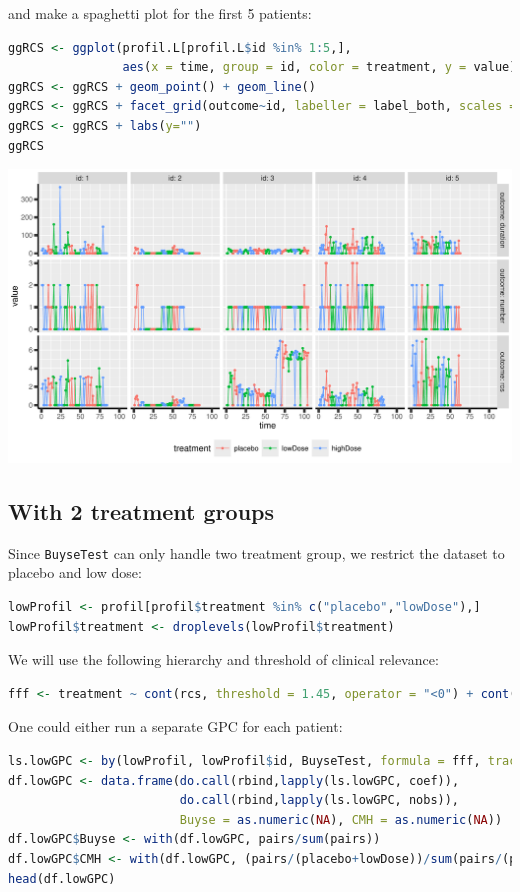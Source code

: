 \documentclass[12pt]{article}
\begin{document}
and make a spaghetti plot for the first 5 patients:
\begin{lstlisting}[language=r,numbers=none]
ggRCS <- ggplot(profil.L[profil.L$id %in% 1:5,],
                aes(x = time, group = id, color = treatment, y = value))
ggRCS <- ggRCS + geom_point() + geom_line() 
ggRCS <- ggRCS + facet_grid(outcome~id, labeller = label_both, scales = "free_y")
ggRCS <- ggRCS + labs(y="")
ggRCS
\end{lstlisting}

\begin{center}
\includegraphics[trim={0 0 0 0},width=1\textwidth]{./figures/spaghetti-Nof1.pdf}
\end{center}
\subsection{With 2 treatment groups}
\label{sec:orgd7505e1}

\noindent Since \texttt{BuyseTest} can only handle two treatment group, we restrict the
dataset to placebo and low dose:
\begin{lstlisting}[language=r,numbers=none]
lowProfil <- profil[profil$treatment %in% c("placebo","lowDose"),]
lowProfil$treatment <- droplevels(lowProfil$treatment)
\end{lstlisting}

We will use the following hierarchy and threshold of clinical
relevance:
\begin{lstlisting}[language=r,numbers=none]
fff <- treatment ~ cont(rcs, threshold = 1.45, operator = "<0") + cont(number, threshold = 0.35, operator = "<0") + cont(duration, threshold = 3, operator = "<0")
\end{lstlisting}

\noindent One could either run a separate GPC for each patient:
\begin{lstlisting}[language=r,numbers=none]
ls.lowGPC <- by(lowProfil, lowProfil$id, BuyseTest, formula = fff, trace = FALSE)
df.lowGPC <- data.frame(do.call(rbind,lapply(ls.lowGPC, coef)),
                        do.call(rbind,lapply(ls.lowGPC, nobs)),
                        Buyse = as.numeric(NA), CMH = as.numeric(NA))
df.lowGPC$Buyse <- with(df.lowGPC, pairs/sum(pairs))
df.lowGPC$CMH <- with(df.lowGPC, (pairs/(placebo+lowDose))/sum(pairs/(placebo+lowDose)))
head(df.lowGPC)
\end{lstlisting}
\end{document}
